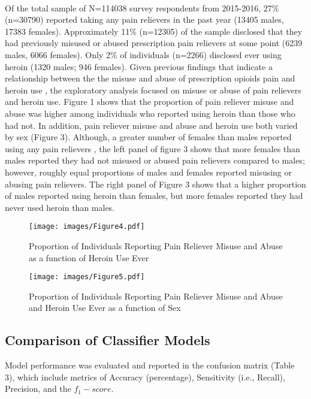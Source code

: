 \\\documentclass[sigconf]{acmart}
\begin{document}
Of the total sample of N=114038 survey respondents from 2015-2016, 27\%
(n=30790) reported taking any pain relievers in the past year (13405 males, 
17383 females). Approximately 11\% (n=12305) of the sample disclosed that 
they had previously misused or abused prescription pain relievers at some 
point (6239 males, 6066 females). Only 2\% of individuals (n=2266) disclosed 
ever using heroin (1320 males; 946 females). Given previous findings 
that indicate a relationship between the the misuse and abuse of prescription
opioids pain and heroin use \cite{muhuri13, unick13}, the exploratory analysis 
focused on misuse or abuse of pain relievers and heroin use. Figure 1 shows 
that the proportion of pain reliever misuse and abuse was higher among 
individuals who reported using heroin than those who had not. In addition, 
pain reliever misuse and abuse and heroin use both varied by sex (Figure 3). 
Although, a greater number of females than males reported using any pain 
relievers , the left panel of figure 3 shows that more females than males
reported they had not misused or abused pain relievers compared to males; 
however, roughly equal proportions of males and females reported misusing or 
abusing pain relievers. The right panel of Figure 3 shows that a higher 
proportion of males reported using heroin than females, but more females 
reported they had never used heroin than males. 

\begin{figure}[!ht]
  \centering\texttt{[image: images/Figure4.pdf]}
  \caption{Proportion of Individuals Reporting Pain Reliever Misuse and Abuse
  as a function of Heroin Use Ever}
  \label{f:Figure4}
\end{figure}

\begin{figure}[!ht]
  \centering\texttt{[image: images/Figure5.pdf]}
  \caption{Proportion of Individuals Reporting Pain Reliever Misuse and Abuse
  and Heroin Use Ever as a function of Sex}
  \label{f:Figure5}
\end{figure}


\subsection{Comparison of Classifier Models}

Model performance was evaluated and reported in the confusion matrix (Table 3), 
which include metrics of Accuracy (percentage), Sensitivity (i.e., Recall), 
Precision, and the $f_1-score$. 
\end{document}
